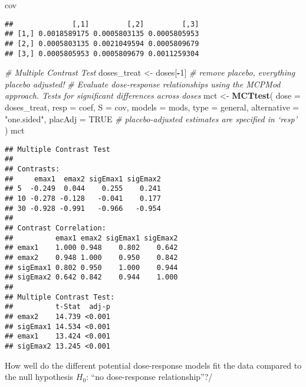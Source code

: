 \documentclass[
]{article}
\newenvironment{Shaded}{\begin{snugshade}}{\end{snugshade}}
\newcommand{\AttributeTok}[1]{\textcolor[rgb]{0.13,0.29,0.53}{#1}}
\newcommand{\CommentTok}[1]{\textcolor[rgb]{0.56,0.35,0.01}{\textit{#1}}}
\newcommand{\ConstantTok}[1]{\textcolor[rgb]{0.56,0.35,0.01}{#1}}
\newcommand{\DecValTok}[1]{\textcolor[rgb]{0.00,0.00,0.81}{#1}}
\newcommand{\FunctionTok}[1]{\textcolor[rgb]{0.13,0.29,0.53}{\textbf{#1}}}
\newcommand{\NormalTok}[1]{#1}
\newcommand{\OtherTok}[1]{\textcolor[rgb]{0.56,0.35,0.01}{#1}}
\newcommand{\SpecialCharTok}[1]{\textcolor[rgb]{0.81,0.36,0.00}{\textbf{#1}}}
\newcommand{\StringTok}[1]{\textcolor[rgb]{0.31,0.60,0.02}{#1}}
\begin{document}
\begin{Shaded}
\begin{Highlighting}[]
\NormalTok{cov}
\end{Highlighting}
\end{Shaded}

\begin{verbatim}
##              [,1]         [,2]         [,3]
## [1,] 0.0018589175 0.0005803135 0.0005805953
## [2,] 0.0005803135 0.0021049594 0.0005809679
## [3,] 0.0005805953 0.0005809679 0.0011259304
\end{verbatim}

\begin{Shaded}
\begin{Highlighting}[]
\CommentTok{\# Multiple Contrast Test}
\NormalTok{doses\_treat }\OtherTok{\textless{}{-}}\NormalTok{ doses[}\SpecialCharTok{{-}}\DecValTok{1}\NormalTok{] }\CommentTok{\# remove placebo, everything placebo adjusted!}
\CommentTok{\# Evaluate dose{-}response relationships using the MCPMod approach. Tests for significant differences across doses}
\NormalTok{mct }\OtherTok{\textless{}{-}}
  \FunctionTok{MCTtest}\NormalTok{(}
    \AttributeTok{dose =}\NormalTok{ doses\_treat,}
    \AttributeTok{resp =}\NormalTok{ coef,}
    \AttributeTok{S =}\NormalTok{ cov,}
    \AttributeTok{models =}\NormalTok{ mods,}
    \AttributeTok{type =} \StringTok{\textquotesingle{}general\textquotesingle{}}\NormalTok{,}
    \AttributeTok{alternative =} \StringTok{"one.sided"}\NormalTok{,}
    \AttributeTok{placAdj =} \ConstantTok{TRUE} \CommentTok{\# placebo{-}adjusted estimates are specified in ‘⁠resp⁠’}
\NormalTok{  )}
\NormalTok{mct}
\end{Highlighting}
\end{Shaded}

\begin{verbatim}
## Multiple Contrast Test
## 
## Contrasts:
##     emax1  emax2 sigEmax1 sigEmax2
## 5  -0.249  0.044    0.255    0.241
## 10 -0.278 -0.128   -0.041    0.177
## 30 -0.928 -0.991   -0.966   -0.954
## 
## Contrast Correlation:
##          emax1 emax2 sigEmax1 sigEmax2
## emax1    1.000 0.948    0.802    0.642
## emax2    0.948 1.000    0.950    0.842
## sigEmax1 0.802 0.950    1.000    0.944
## sigEmax2 0.642 0.842    0.944    1.000
## 
## Multiple Contrast Test:
##          t-Stat  adj-p
## emax2    14.739 <0.001
## sigEmax1 14.534 <0.001
## emax1    13.424 <0.001
## sigEmax2 13.245 <0.001
\end{verbatim}

How well do the different potential dose-response models fit the data
compared to the null hypothesis \(H_0\): ``no dose-response
relationship''?/
\end{document}
